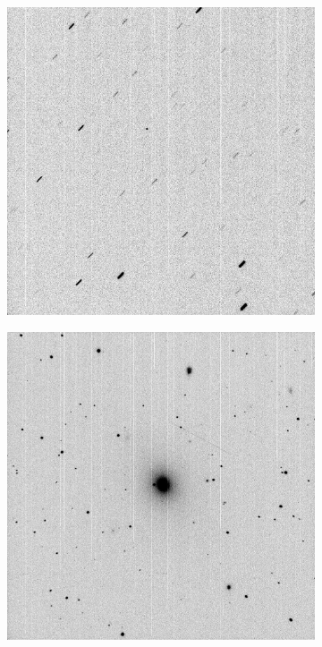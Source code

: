 \begin{figure}[!h]
    \begin{subfigure}{.3\textwidth}
        \centering
        \includegraphics[width=\textwidth]{images/StreakPoint00.jpg}
    \end{subfigure}
    \hfill
    \begin{subfigure}{.3\textwidth}
        \centering
        \includegraphics[width=\textwidth]{images/galaxypoints.jpg}

\end{subfigure}
\end{figure}
